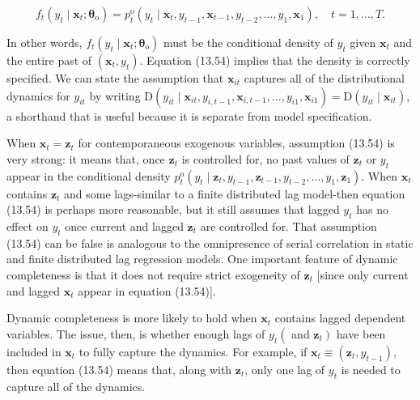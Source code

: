 \documentclass[10pt]{article}
\begin{document}
\begin{equation*}
f_{t}\left(y_{t} \mid \mathbf{x}_{t} ; \boldsymbol{\theta}_{\mathrm{o}}\right)=p_{t}^{\mathrm{o}}\left(y_{t} \mid \mathbf{x}_{t}, y_{t-1}, \mathbf{x}_{t-1}, y_{t-2}, \ldots, y_{1}, \mathbf{x}_{1}\right), \quad t=1, \ldots, T . \tag{13.54}
\end{equation*}


In other words, $f_{t}\left(y_{t} \mid \mathbf{x}_{t} ; \boldsymbol{\theta}_{\mathrm{o}}\right)$ must be the conditional density of $y_{t}$ given $\mathbf{x}_{t}$ and the entire past of $\left(\mathbf{x}_{t}, y_{t}\right)$. Equation (13.54) implies that the density is correctly specified. We can state the assumption that $\mathbf{x}_{i t}$ captures all of the distributional dynamics for $y_{i t}$ by writing $\mathrm{D}\left(y_{i t} \mid \mathbf{x}_{i t}, y_{i, t-1}, \mathbf{x}_{i, t-1}, \ldots, y_{i 1}, \mathbf{x}_{i 1}\right)=\mathrm{D}\left(y_{i t} \mid \mathbf{x}_{i t}\right)$, a shorthand that is useful because it is separate from model specification.

When $\mathbf{x}_{t}=\mathbf{z}_{t}$ for contemporaneous exogenous variables, assumption (13.54) is very strong: it means that, once $\mathbf{z}_{t}$ is controlled for, no past values of $\mathbf{z}_{t}$ or $y_{t}$ appear in the conditional density $p_{t}^{\mathrm{o}}\left(y_{t} \mid \mathbf{z}_{t}, y_{t-1}, \mathbf{z}_{t-1}, y_{t-2}, \ldots, y_{1}, \mathbf{z}_{1}\right)$. When $\mathbf{x}_{t}$ contains $\mathbf{z}_{t}$ and some lags-similar to a finite distributed lag model-then equation (13.54) is perhaps more reasonable, but it still assumes that lagged $y_{t}$ has no effect on $y_{t}$ once current and lagged $\mathbf{z}_{t}$ are controlled for. That assumption (13.54) can be false is analogous to the omnipresence of serial correlation in static and finite distributed lag regression models. One important feature of dynamic completeness is that it does not require strict exogeneity of $\mathbf{z}_{t}$ [since only current and lagged $\mathbf{x}_{t}$ appear in equation (13.54)].

Dynamic completeness is more likely to hold when $\mathbf{x}_{t}$ contains lagged dependent variables. The issue, then, is whether enough lags of $y_{t}\left(\right.$ and $\left.\mathbf{z}_{t}\right)$ have been included in $\mathbf{x}_{t}$ to fully capture the dynamics. For example, if $\mathbf{x}_{t} \equiv\left(\mathbf{z}_{t}, y_{t-1}\right)$, then equation (13.54) means that, along with $\mathbf{z}_{t}$, only one lag of $y_{t}$ is needed to capture all of the dynamics.
\end{document}
